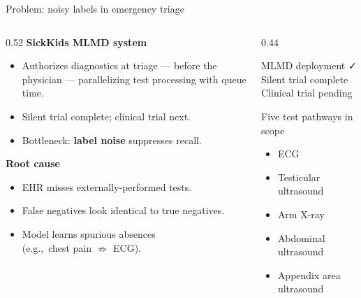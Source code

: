 \documentclass[aspectratio=169]{beamer}
\begin{document}
\begin{frame}{Problem: noisy labels in emergency triage}
  \begin{columns}[T]
    \begin{column}{0.52\textwidth}
      \textbf{SickKids MLMD system}
      \begin{itemize}
        \item Authorizes diagnostics at triage --- before the physician ---
              parallelizing test processing with queue time.
        \item Silent trial complete; clinical trial next.
        \item Bottleneck: \textbf{label noise} suppresses recall.
      \end{itemize}
      \vspace{0.8em}
      \textbf{Root cause}
      \begin{itemize}
        \item EHR misses externally-performed tests.
        \item False negatives look identical to true negatives.
        \item Model learns spurious absences\\
              (e.g.,\ chest pain $\not\Rightarrow$ ECG).
      \end{itemize}
    \end{column}
    \begin{column}{0.44\textwidth}
      \begin{block}{MLMD deployment}
        \small
        \faCheck\; Silent trial complete\\
        \faArrowRight\; Clinical trial pending
      \end{block}

      \vspace{0.5em}
      \begin{block}{Five test pathways in scope}
        \small
        \begin{itemize}
          \item[\faHeartbeat]    ECG
          \item[\faSearch]       Testicular ultrasound
          \item[\faBone]         Arm X-ray
          \item[\faNotesMedical] Abdominal ultrasound
          \item[\faNotesMedical] Appendix area ultrasound
        \end{itemize}
      \end{block}
    \end{column}
  \end{columns}
\end{frame}
\end{document}
